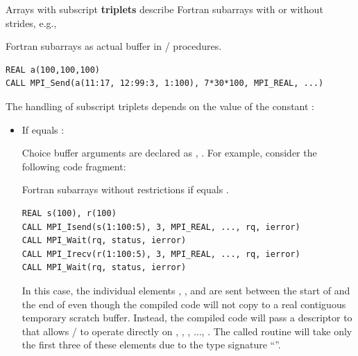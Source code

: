 Arrays with subscript \textbf{triplets} describe Fortran subarrays with or without strides, e.g.,

\begin{example}
Fortran subarrays as actual buffer in \MPI/ procedures.
\label{exa:lang:subarray:triplets}
%
%
\begin{lstlisting}[language={[MPI]Fortran}]
REAL a(100,100,100)
CALL MPI_Send(a(11:17, 12:99:3, 1:100), 7*30*100, MPI_REAL, ...)
\end{lstlisting}
\end{example}
The handling of subscript triplets depends on the value of the constant :
\begin{itemize}
\item If  equals :

 Choice buffer arguments are declared as , .
 For example, consider the following code fragment:

\begin{example}
Fortran subarrays without restrictions if  equals .
\label{exa:lang:subarray:supported}
%
%
\begin{lstlisting}[language={[MPI]Fortran}]
REAL s(100), r(100)
CALL MPI_Isend(s(1:100:5), 3, MPI_REAL, ..., rq, ierror)
CALL MPI_Wait(rq, status, ierror)
CALL MPI_Irecv(r(1:100:5), 3, MPI_REAL, ..., rq, ierror)
CALL MPI_Wait(rq, status, ierror)
\end{lstlisting}
\end{example}

 In this case, the individual elements , , and  are sent
 between the start of  and
 the end of  even though the
 compiled code will not copy  to a real contiguous temporary
 scratch buffer.  Instead, the compiled code will pass a descriptor to
  that allows \MPI/ to operate directly
 on , , , $\ldots$, .
 The called  routine will take only the first three
 of these elements due to the type signature ``''.


\end{itemize}
